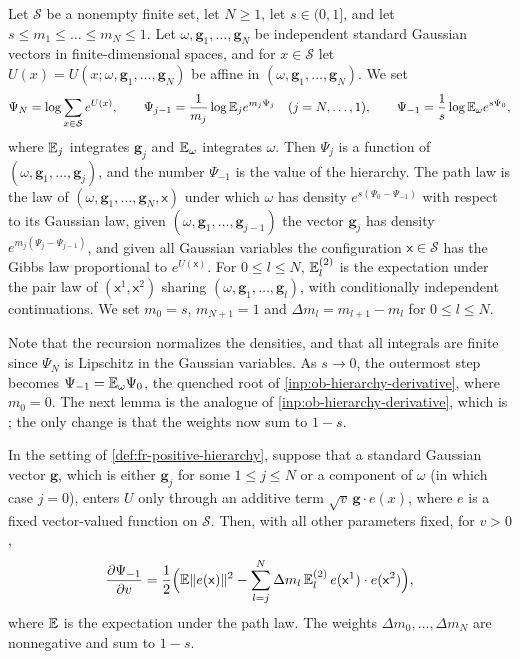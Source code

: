 \begin{definition}\label{def:fr-positive-hierarchy}
Let $\mathcal S$ be a nonempty finite set, let $N\ge1$, let $s\in(0,1]$, and let $s\le m_1\le\dots\le m_N\le1$. Let $\omega,\mathbf g_1,\dots,\mathbf g_N$ be independent standard Gaussian vectors in finite-dimensional spaces, and for $x\in\mathcal S$ let $U(x)=U(x;\omega,\mathbf g_1,\dots,\mathbf g_N)$ be affine in $(\omega,\mathbf g_1,\dots,\mathbf g_N)$. We set
\[
 \Psi_N=\log\sum_{x\in\mathcal S}e^{U(x)},\qquad
 \Psi_{j-1}=\frac1{m_j}\log\mathbb E_je^{m_j\Psi_j}\quad(j=N,\dots,1),\qquad
 \Psi_{-1}=\frac1s\log\mathbb E_\omega e^{s\Psi_0},
\]
where $\mathbb E_j$ integrates $\mathbf g_j$ and $\mathbb E_\omega$ integrates $\omega$. Then $\Psi_j$ is a function of $(\omega,\mathbf g_1,\dots,\mathbf g_j)$, and the number $\Psi_{-1}$ is the value of the hierarchy. The path law is the law of $(\omega,\mathbf g_1,\dots,\mathbf g_N,\mathsf x)$ under which $\omega$ has density $e^{s(\Psi_0-\Psi_{-1})}$ with respect to its Gaussian law, given $(\omega,\mathbf g_1,\dots,\mathbf g_{j-1})$ the vector $\mathbf g_j$ has density $e^{m_j(\Psi_j-\Psi_{j-1})}$, and given all Gaussian variables the configuration $\mathsf x\in\mathcal S$ has the Gibbs law proportional to $e^{U(\mathsf x)}$. For $0\le l\le N$, $\mathbb E_l^{(2)}$ is the expectation under the pair law of $(\mathsf x^1,\mathsf x^2)$ sharing $(\omega,\mathbf g_1,\dots,\mathbf g_l)$, with conditionally independent continuations. We set $m_0=s$, $m_{N+1}=1$ and $\Delta m_l=m_{l+1}-m_l$ for $0\le l\le N$.
\end{definition}

Note that the recursion normalizes the densities, and that all integrals are finite since $\Psi_N$ is Lipschitz in the Gaussian variables. As $s\to0$, the outermost step becomes $\Psi_{-1}=\mathbb E_\omega\Psi_0$, the quenched root of \cref{inp:ob-hierarchy-derivative}, where $m_0=0$. The next lemma is the analogue of \cref{inp:ob-hierarchy-derivative}, which is \cite[Lemma~2.2]{oai-barriers}; the only change is that the weights now sum to $1-s$.

\begin{lemma}\label{lem:fr-derivative}
In the setting of \cref{def:fr-positive-hierarchy}, suppose that a standard Gaussian vector $\mathbf g$, which is either $\mathbf g_j$ for some $1\le j\le N$ or a component of $\omega$ (in which case $j=0$), enters $U$ only through an additive term $\sqrt v\,\mathbf g\cdot e(x)$, where $e$ is a fixed vector-valued function on $\mathcal S$. Then, with all other parameters fixed, for $v>0$,
\begin{equation}\label{b:eq:positive-tree-derivative}
 \frac{\partial\Psi_{-1}}{\partial v}
 =\frac12\Bigl(\mathbb E\lVert e(\mathsf x)\rVert^2-\sum_{l=j}^N\Delta m_l\,\mathbb E^{(2)}_l\,e(\mathsf x^1)\cdot e(\mathsf x^2)\Bigr),
\end{equation}
where $\mathbb E$ is the expectation under the path law. The weights $\Delta m_0,\dots,\Delta m_N$ are nonnegative and sum to $1-s$.
\end{lemma}

